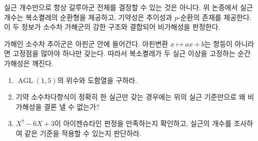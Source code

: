 \begin{remark}
실근 개수만으로 항상 갈루아군 전체를 결정할 수 있는 것은 아니다. 위 논증에서 실근 개수는 복소켤레의 순환형을 제공하고, 기약성은 추이성과 $p$-순환의 존재를 제공한다. 이 두 정보가 소수차 가해군의 강한 구조와 결합되어 비가해성을 판정한다.
\end{remark}

\begin{keyidea}
가해인 소수차 추이군은 아핀군 안에 들어간다. 아핀변환 $x\mapsto ax+b$는 항등이 아니라면 고정점을 많아야 하나만 갖는다. 따라서 복소켤레가 두 실근 이상을 고정하는 순간 가해성은 깨진다.
\end{keyidea}

\begin{checkpoint}
\begin{enumerate}[label=(\alph*)]
  \item $\operatorname{AGL}(1,5)$의 위수와 도함열을 구하라.
  \item 기약 소수차다항식이 정확히 한 실근만 갖는 경우에는 위의 실근 기준만으로 왜 비가해성을 결론 낼 수 없는가?
  \item $X^7-6X+3$이 아이젠슈타인 판정을 만족하는지 확인하고, 실근의 개수를 조사하여 같은 기준을 적용할 수 있는지 판단하라.
\end{enumerate}
\end{checkpoint}
